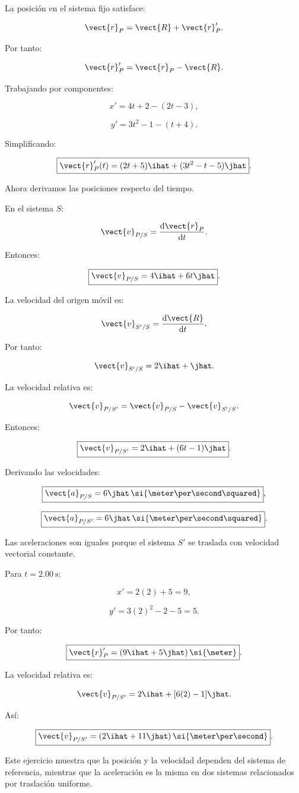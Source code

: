 \begin{explicacion}
La posición en el sistema fijo satisface:

\[
\vect{r}_P
=
\vect{R}+\vect{r}'_P.
\]

Por tanto:

\[
\vect{r}'_P
=
\vect{r}_P-\vect{R}.
\]

Trabajando por componentes:

\[
x'=4t+2-(2t-3),
\]

\[
y'=3t^2-1-(t+4).
\]

Simplificando:

\[
\boxed{
\vect{r}'_P(t)
=
(2t+5)\ihat+(3t^2-t-5)\jhat
}.
\]

Ahora derivamos las posiciones
respecto del tiempo.

En el sistema \(S\):

\[
\vect{v}_{P/S}
=
\frac{\mathrm{d}\vect{r}_P}{\mathrm{d}t}.
\]

Entonces:

\[
\boxed{
\vect{v}_{P/S}
=
4\ihat+6t\jhat
}.
\]

La velocidad del origen móvil es:

\[
\vect{v}_{S'/S}
=
\frac{\mathrm{d}\vect{R}}{\mathrm{d}t}.
\]

Por tanto:

\[
\vect{v}_{S'/S}
=
2\ihat+\jhat.
\]

La velocidad relativa es:

\[
\vect{v}_{P/S'}
=
\vect{v}_{P/S}-\vect{v}_{S'/S}.
\]

Entonces:

\[
\boxed{
\vect{v}_{P/S'}
=
2\ihat+(6t-1)\jhat
}.
\]

Derivando las velocidades:

\[
\boxed{
\vect{a}_{P/S}=6\jhat\,
\si{\meter\per\second\squared}
},
\]

\[
\boxed{
\vect{a}_{P/S'}=6\jhat\,
\si{\meter\per\second\squared}
}.
\]

Las aceleraciones son iguales porque
el sistema \(S'\) se traslada con
velocidad vectorial constante.

Para \(t=\SI{2.00}{\second}\):

\[
x'=2(2)+5=9,
\]

\[
y'=3(2)^2-2-5=5.
\]

Por tanto:

\[
\boxed{
\vect{r}'_P
=
(9\ihat+5\jhat)\,\si{\meter}
}.
\]

La velocidad relativa es:

\[
\vect{v}_{P/S'}
=
2\ihat+[6(2)-1]\jhat.
\]

Así:

\[
\boxed{
\vect{v}_{P/S'}
=
(2\ihat+11\jhat)\,
\si{\meter\per\second}
}.
\]

Este ejercicio muestra que la posición
y la velocidad dependen del sistema
de referencia, mientras que la aceleración
es la misma en dos sistemas relacionados
por traslación uniforme.
\end{explicacion}


